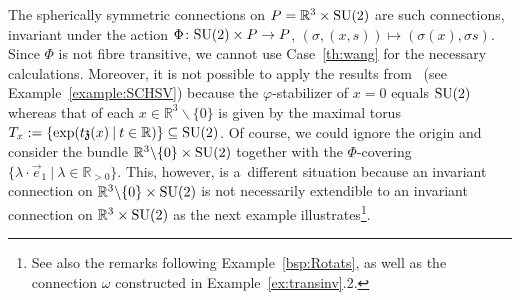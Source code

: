 \documentclass[pdftex]{sigma}
\numberwithin{equation}{section}
\begin{document}
The spherically symmetric connections on $P=\mathbb{R}^3\times {\rm SU}(2)$ are such connections, invariant under the action
$\Phi\colon {\rm SU}(2) \times P\rightarrow P$, $(\sigma,(x,s))\mapsto (\sigma(x),\sigma s)$.
Since $\Phi$ is not f\/ibre transitive, we cannot use Case~\ref{th:wang} for the necessary calculations.
Moreover, it is not possible to apply the results from~\cite{HarSni} (see Example~\ref{example:SCHSV}) because the
$\varphi$-stabilizer of $x=0$ equals ${\rm SU}(2)$ whereas that of each $x\in \mathbb{R}^3\backslash \{0\}$ is given by the
maximal torus $T_x:=\{\exp(t {\mathfrak{z}}(x) \:|\: t\in \mathbb{R})\}\subseteq {\rm SU}(2)$.
Of course, we could ignore the origin and consider the bundle $\mathbb{R}^3\backslash \{0\}\times {\rm SU}(2)$ together with
the $\Phi$-covering $\{\lambda \cdot \vec{e}_1\:|\: \lambda \in \mathbb{R}_{>0}\}$.
This, however, is a~dif\/ferent situation because an invariant connection on $\mathbb{R}^3\backslash \{0\}\times {\rm SU}(2)$ is
not necessarily extendible to an invariant connection on $\mathbb{R}^3\times {\rm SU}(2)$ as the next example
illustrates\footnote{See also the remarks following Example~\ref{bsp:Rotats}, as well as the connection $\omega$ constructed in Example~\ref{ex:transinv}.2.}.
\end{document}

